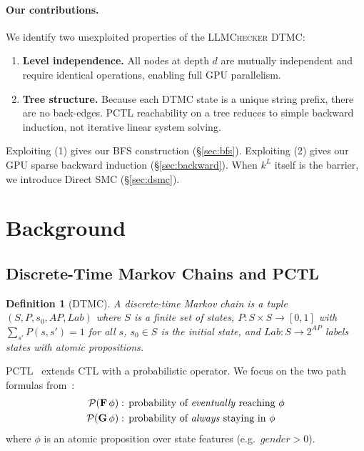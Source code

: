 \documentclass{article}
\newtheorem{definition}{Definition}
\begin{document}
\paragraph{Our contributions.}
We identify two unexploited properties of the \textsc{LLMChecker} DTMC:
\begin{enumerate}
  \item \textbf{Level independence.}  All nodes at depth $d$ are mutually
    independent and require identical operations, enabling full GPU parallelism.
  \item \textbf{Tree structure.}  Because each DTMC state is a unique string
    prefix, there are no back-edges.  PCTL reachability on a tree
    reduces to simple backward induction, not iterative linear system solving.
\end{enumerate}
Exploiting (1) gives our BFS construction (\S\ref{sec:bfs}).
Exploiting (2) gives our GPU sparse backward induction (\S\ref{sec:backward}).
When $k^L$ itself is the barrier, we introduce Direct SMC (\S\ref{sec:dsmc}).

\section{Background}
\label{sec:background}

\subsection{Discrete-Time Markov Chains and PCTL}

\begin{definition}[DTMC]
A \emph{discrete-time Markov chain} is a tuple
$(S, P, s_0, \mathit{AP}, \mathit{Lab})$ where $S$ is a finite set of states,
$P: S \times S \to [0,1]$ with $\sum_{s'} P(s,s') = 1$ for all $s$,
$s_0 \in S$ is the initial state, and $\mathit{Lab}: S \to 2^{\mathit{AP}}$
labels states with atomic propositions.
\end{definition}

PCTL~\citep{hansson1994logic} extends CTL with a probabilistic operator.
We focus on the two path formulas from~\citet{gross2025llmchecker}:
\begin{align}
  \mathcal{P}(\mathbf{F}\,\phi)
    &\;\text{: probability of \emph{eventually} reaching $\phi$} \label{eq:eventually}\\
  \mathcal{P}(\mathbf{G}\,\phi)
    &\;\text{: probability of \emph{always} staying in $\phi$} \label{eq:always}
\end{align}
where $\phi$ is an atomic proposition over state features
(e.g.\ $\textit{gender} > 0$).
\end{document}
